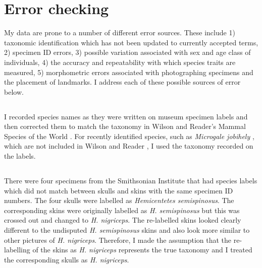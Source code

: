 

\section{Error checking}
\label{sect:errors}
	My data are prone to a number of different error sources. These include 1) taxonomic identification which has not been updated to currently accepted terms, 2) specimen ID errors, 3) possible variation associated with sex and age class of individuals, 4) the accuracy and repeatability with which species traits are measured, 5) morphometric errors associated with photographing specimens and the placement of landmarks. I address each of these possible sources of error below.  

\subsection{}
	I recorded species names as they were written on museum specimen labels and then corrected them to match the taxonomy in Wilson and Reader’s Mammal Species of the World \citeyearpar{Wilson2005}. For recently identified species, such as \textit{Microgale jobihely} \citep{Goodman2006}, which are not included in Wilson and Reader \citeyearpar{Wilson2005}, I used the taxonomy recorded on the labels. 

\subsection{}
	
	There were four specimens from the Smithsonian Institute that had species labels which did not match between skulls and skins with the same specimen ID numbers. The four skulls were labelled as \textit{Hemicentetes semispinosus}. The corresponding skins were originally labelled as \textit{H. semispinosus} but this was crossed out and changed to \textit{H. nigriceps}. The re-labelled skins looked clearly different to the undisputed \textit{H. semispinosus} skins and also look more similar to other pictures of \textit{H. nigriceps}. Therefore, I made the assumption that the re-labelling of the skins as \textit{H. nigriceps} represents the true taxonomy and I treated the corresponding skulls as \textit{H. nigriceps}.

